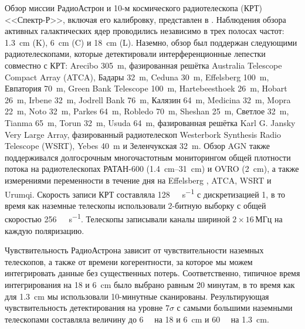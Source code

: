 Обзор миссии РадиоАстрон и 10-м космического радиотелескопа (КРТ) <<Спектр-Р>>, включая его
калибровку, представлен в \cite{Kardashev_2013_rus,Kovalev_2014_rus}. Наблюдения обзора активных
галактических ядер проводились независимо в трех полосах частот: \SI{1.3}{\cm} (K), \SI{6}{\cm} (C)
и \SI{18}{\cm} (L). Наземно, обзор был поддержан следующими радиотелескопами, которые детектировали
интерференционные лепестки совместно с КРТ: Arecibo \SI{305}{\m}, фазированная решётка Australia
Telescope Compact Array (ATCA), Бадары \SI{32}{\m}, Ceduna \SI{30}{\m}, Effelsberg \SI{100}{\m},
Евпатория \SI{70}{\m}, Green Bank Telescope \SI{100}{\m},  Hartebeesthoek \SI{26}{\m}, Hobart
\SI{26}{\m}, Irbene \SI{32}{\m}, Jodrell Bank \SI{76}{\m}, Калязин \SI{64}{\m}, Medicina
\SI{32}{\m}, Mopra \SI{22}{\m}, Noto \SI{32}{\m}, Parkes \SI{64}{\m}, Robledo \SI{70}{\m}, Sheshan
\SI{25}{\m}, Светлое \SI{32}{\m}, Tianma \SI{65}{\m}, Torun \SI{32}{\m}, Usuda \SI{64}{\m},
фазированная решётка Karl G. Jansky Very Large Array, фазированный радиотелескоп Westerbork
Synthesis Radio Telescope (WSRT), Yebes \SI{40}{\m} и Зеленчукская \SI{32}{\m}. Обзор AGN также
поддерживался долгосрочным многочастотным мониторингом общей плотности потока на радиотелескопах
РАТАН-600 (\SIrange{1.4}{31}{\cm}) и OVRO (\SI{2}{\cm}), а также измерениями переменности в течение
дня на Effelsberg \cite{Liu_2018}, ATCA, WSRT и Urumqi. Скорость записи КРТ составляла
\SI{128}{\mega\bit\per\second} с дискретизацией \SI{1}{\bit}, в то время как наземные телескопы
использовали 2-битную выборку с общей скоростью \SI{256}{\mega\bit\per\second}. Телескопы записывали
каналы шириной $2\times16$\,МГц на каждую поляризацию.

Чувствительность РадиоАстрона зависит от чувствительности наземных телескопов, а также от времени
когерентности, за которое мы можем интегрировать данные без существенных потерь. Соответственно,
типичное время интегрирования на 18 и \SI{6}{\cm} было выбрано равным 20 минутам, в то время как для
\SI{1.3}{\cm} мы использовали 10-минутные сканированы. Результирующая чувствительность
детектирования на уровне $7\sigma$ с самыми большими наземными телескопами составляла величину до
\SI{6}{\milli\jansky} на 18 и \SI{6}{\cm} и \SI{60}{\milli\jansky} на \SI{1.3}{\cm}.

